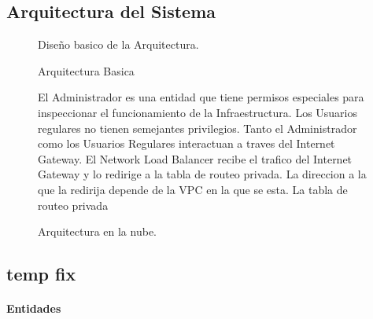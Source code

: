 \documentclass{article}
\begin{document}
  \subsection{Arquitectura del Sistema}
  \begin{figure}[!htb]
    \begin{center}
      
    \end{center}
    \caption{Arquitectura Basica}\label{fig: }
  Dise\~no basico de la Arquitectura.
  \end{figure}

  \begin{figure}[!htb]
    \begin{center}
      
    \end{center}
    \caption{Arquitectura en la nube.}\label{fig: Implementacion en la Nube}
    El Administrador es una entidad que tiene permisos especiales para inspeccionar el funcionamiento de la Infraestructura.
    Los Usuarios regulares no tienen semejantes privilegios.
    Tanto el Administrador como los Usuarios Regulares interactuan a traves del Internet Gateway.
    El Network Load Balancer recibe el trafico del Internet Gateway y lo redirige a la tabla de routeo privada. La direccion a la que la redirija depende de la VPC en la que se esta.
    La tabla de routeo privada 

  \end{figure}
  \subsection{temp fix}
  \paragraph{ Entidades }
      \iffalse{
    NOTE 1—Design attributes can be thought of as questions about design elements. The answers to those questions are
    the values of the attributes. All the questions can be answered, but the content of the answer will depend upon the
    nature of the entity. The collection of answers provides a complete description of an entity. Attribute descriptions
    should include references and design considerations such as tradeoffs and assumptions when appropriate. In some
    cases, attribute descriptions may have the value none.
    NOTE 2—Design attributes have been generalized from the concept of design entity attribute (which appeared in
    IEEE Std 1016-1998 and applied only to design entities) to apply to design entities, design relationships, and design
    constraints.
    NOTE 3—Use of the design attributes in 4.6.2.1 through 4.6.2.3 ensures compatibility with IEEE Std 1016-1998. Other
    design attributes required as a part of specific design viewpoints are defined with those viewpoints in Clause 5. Some
    design attributes [such as subordinates (see 5.3.2.2)] can be more usefully represented as design relationships. This was
    endif
      } \fi 
\end{document}
